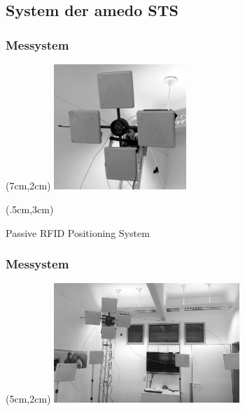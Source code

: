 \subsection{System der amedo STS}
\begin{frame}
  \frametitle{Messystem}
	\begin{textblock*}{5cm}(7cm,2cm) %
  		\includegraphics[width=5cm]{../img/4AntennaSetup_small.png}
  	\end{textblock*}
  	\begin{textblock*}{5cm}(.5cm,3cm) %
  		\begin{prps}
  		Passive RFID Positioning System
  		\end{prps}
  	\end{textblock*}
\end{frame}
\begin{frame}
  \frametitle{Messystem}
	\begin{textblock*}{7cm}(5cm,2cm) %
  		\includegraphics[width=7cm]{../img/RFID-Okto.png}
  	\end{textblock*}
\end{frame}
